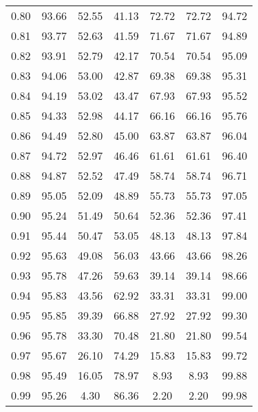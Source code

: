 \begin{tabular}{|c|c|c|c|c|c|c|}
      0.80 &     93.66 &     52.55 &      41.13 &   72.72 &      72.72 &         94.72 \\
      0.81 &     93.77 &     52.63 &      41.59 &   71.67 &      71.67 &         94.89 \\
      0.82 &     93.91 &     52.79 &      42.17 &   70.54 &      70.54 &         95.09 \\
      0.83 &     94.06 &     53.00 &      42.87 &   69.38 &      69.38 &         95.31 \\
      0.84 &     94.19 &     53.02 &      43.47 &   67.93 &      67.93 &         95.52 \\
      0.85 &     94.33 &     52.98 &      44.17 &   66.16 &      66.16 &         95.76 \\
      0.86 &     94.49 &     52.80 &      45.00 &   63.87 &      63.87 &         96.04 \\
      0.87 &     94.72 &     52.97 &      46.46 &   61.61 &      61.61 &         96.40 \\
      0.88 &     94.87 &     52.52 &      47.49 &   58.74 &      58.74 &         96.71 \\
      0.89 &     95.05 &     52.09 &      48.89 &   55.73 &      55.73 &         97.05 \\
      0.90 &     95.24 &     51.49 &      50.64 &   52.36 &      52.36 &         97.41 \\
      0.91 &     95.44 &     50.47 &      53.05 &   48.13 &      48.13 &         97.84 \\
      0.92 &     95.63 &     49.08 &      56.03 &   43.66 &      43.66 &         98.26 \\
      0.93 &     95.78 &     47.26 &      59.63 &   39.14 &      39.14 &         98.66 \\
      0.94 &     95.83 &     43.56 &      62.92 &   33.31 &      33.31 &         99.00 \\
      0.95 &     95.85 &     39.39 &      66.88 &   27.92 &      27.92 &         99.30 \\
      0.96 &     95.78 &     33.30 &      70.48 &   21.80 &      21.80 &         99.54 \\
      0.97 &     95.67 &     26.10 &      74.29 &   15.83 &      15.83 &         99.72 \\
      0.98 &     95.49 &     16.05 &      78.97 &    8.93 &       8.93 &         99.88 \\
      0.99 &     95.26 &      4.30 &      86.36 &    2.20 &       2.20 &         99.98 \\
\bottomrule
\end{tabular}
